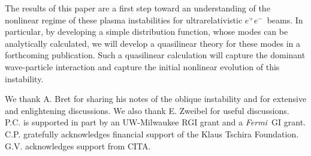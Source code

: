 \documentclass[usenatbib,iop,apj,numberedappendix]{aeb_emulateapj_2010}
\newcommand{\epm}{\ensuremath{e^+e^-}}
\def\Fermi{{\em Fermi\ }}
\begin{document}
The results of this paper are a first step toward an understanding of the nonlinear regime of these plasma instabilities for ultrarelativistic \epm\ beams.  In particular, by developing a simple distribution function, whose modes can be analytically calculated, we will develop a quasilinear theory for these modes in a forthcoming publication.  Such a quasilinear calculation will capture the dominant wave-particle interaction and capture the initial nonlinear evolution of this instability.  

\acknowledgements

We thank A. Bret for sharing his notes of the oblique instability and for extensive and enlightening discussions. We also thank E. Zweibel for useful discussions. P.C. is supported in part by an UW-Milwaukee RGI grant and a \Fermi GI grant.  C.P. gratefully
acknowledges financial support of the Klaus Tschira Foundation. G.V. acknowledges support from CITA.\\


\appendix
\end{document}
